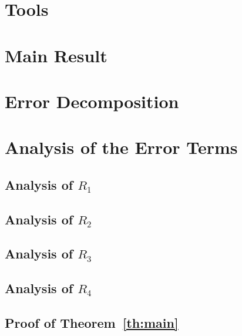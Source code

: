 \section{Tools}
  
\section{Main Result}
  
\section{Error Decomposition}
  
\section{Analysis of the Error Terms}
  \subsection{Analysis of $R_1$}
    
  \subsection{Analysis of $R_2$}
    
  \subsection{Analysis of $R_3$}
    
  \subsection{Analysis of $R_4$}
    
  \subsection{Proof of Theorem~\ref{th:main}}
    
